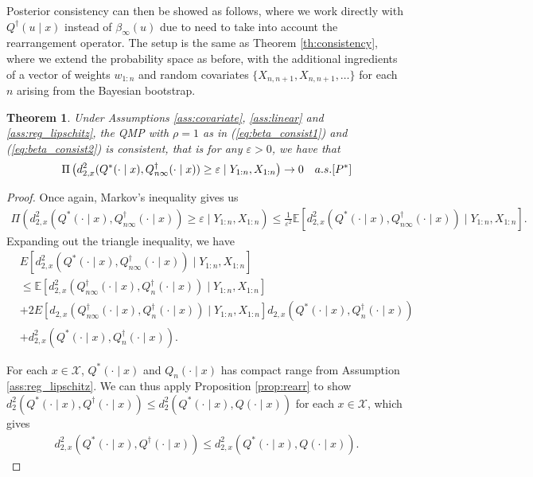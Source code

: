\documentclass[11pt,a4paper]{article}
\newtheorem{thm}{Theorem}
\newcommand{\E}{\mathbb{E}}
\begin{document}
\begin{appendices}
Posterior consistency can then be showed as follows, where we work directly with $Q^{\dagger}(u \mid x)$ instead of $\beta_\infty(u)$ due to need to take into account the rearrangement operator. The setup is the same as {Theorem \ref{th:consistency}}, where we extend the probability space as before, with the additional ingredients of a vector of weights $w_{1:n}$ and random covariates $\{X_{n,n+1},X_{n,n+1},\ldots\}$ for each $n$ arising from the Bayesian bootstrap.
\begin{thm}
    Under {Assumptions \ref{ass:covariate}}, {\ref{ass:linear}} and {\ref{ass:reg_lipschitz}}, the QMP with $\rho = 1$ as in (\ref{eq:beta_consist1}) and (\ref{eq:beta_consist2}) is consistent, that is for any $\varepsilon > 0$, we have that
    \begin{align*}
    \Pi\left({d}^2_{2,x}(Q^*(\cdot \mid x),Q_{n\infty}^{\dagger}(\cdot \mid x)) \geq \varepsilon \mid Y_{1:n}, X_{1:n}\right) \to 0 \quad \textnormal{a.s.}[P^*]
    \end{align*}
 \end{thm}
 \begin{proof}
Once again, Markov's inequality gives us
\begin{align*}
    \Pi\left({d}^2_{2,x}(Q^*(\cdot \mid x),Q_{n\infty}^{\dagger}(\cdot \mid x)) \geq \varepsilon \mid Y_{1:n}, X_{1:n}\right)\leq \frac{1}{\varepsilon^2}\E\left[{d}^2_{2,x}(Q^*(\cdot \mid x),Q_{n\infty}^{\dagger}(\cdot \mid x)) \mid Y_{1:n}, X_{1:n}\right].
\end{align*}
Expanding out the triangle inequality, we have
\begin{equation}
\begin{aligned}\label{app:eq_triangle}
    &E\left[{d}^2_{2,x}(Q^*(\cdot \mid x),Q_{n\infty}^{\dagger}(\cdot \mid x)) \mid Y_{1:n}, X_{1:n}\right]  \\
    &\leq\E\left[{d}^2_{2,x}(Q_{n\infty}^{\dagger}(\cdot \mid x), Q^{\dagger}_n(\cdot \mid x))\mid Y_{1:n}, X_{1:n}\right] \\
    &+ 2E\left[{d}_{2,x}(Q_{n\infty}^{\dagger}(\cdot \mid x), Q^{\dagger}_n(\cdot \mid x))\mid Y_{1:n}, X_{1:n}\right]{d}_{2,x}(Q^*(\cdot \mid x), Q^{\dagger}_n(\cdot \mid x))\\
&+ {d}^2_{2,x}(Q^*(\cdot \mid x), Q^{\dagger}_n(\cdot \mid x)).
\end{aligned}
\end{equation}

For each $x \in \mathcal{X}$, $Q^*(\cdot \mid x)$ and $Q_n(\cdot \mid x)$ has compact range from {Assumption \ref{ass:reg_lipschitz}}. We can thus apply {Proposition \ref{prop:rearr}} to show  
${d}^2_{2}(Q^*(\cdot \mid x), Q^{\dagger}(\cdot \mid x)) \leq {d}^2_{2}(Q^*(\cdot \mid x), Q(\cdot \mid x))$ for each $x \in \mathcal{X}$, which gives
\begin{align*}
    {d}^2_{2,x}(Q^*(\cdot \mid x), Q^{\dagger}(\cdot \mid x)) \leq {d}^2_{2,x}(Q^*(\cdot \mid x), Q(\cdot \mid x)).
\end{align*}



\end{proof}
\end{appendices}
\end{document}
